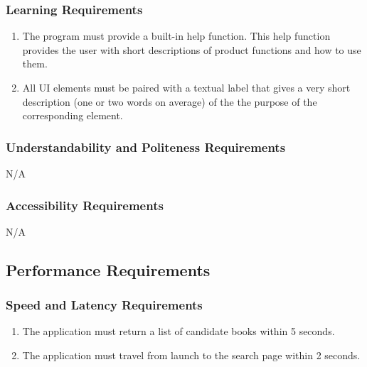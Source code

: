 \documentclass[12pt]{article}
\begin{document}
    \subsubsection{Learning Requirements}
    \label{ssub:learning_requirements}
    \begin{enumerate}[{UH}1. ]
        \item The program must provide a built-in help function. This help function provides the user with short descriptions of product functions and how to use them.
        \item All UI elements must be paired with a textual label that gives a very short description (one or two words on average) of the the purpose of the corresponding element.
    \end{enumerate}
    
    \subsubsection{Understandability and Politeness Requirements}
    \label{ssub:understandability_and_politeness_requirements}
    N/A
    
    \subsubsection{Accessibility Requirements}
    \label{ssub:accessibility_requirements}
    N/A
    
    
    \subsection{Performance Requirements}
    \label{sub:performance_requirements}
    
    \subsubsection{Speed and Latency Requirements}
    \label{ssub:speed_and_latency_requirements}
    \begin{enumerate}[{PR-SL}1. ]
        \item The application must return a list of candidate books within 5 seconds.
        \item The application must travel from launch to the search page within 2 seconds.
    \end{enumerate}
    
\end{document}
